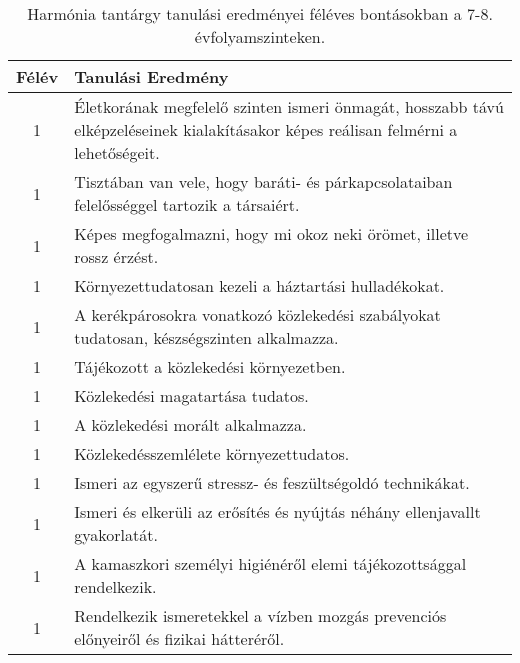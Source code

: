        
           \begin{longtable}{c | p{12cm} }
            \caption[Harmónia 7-8.]{Harmónia tantárgy tanulási eredményei féléves bontásokban a 7-8. évfolyamszinteken. }  \\

            \textbf{Félév} & \textbf{Tanulási Eredmény} \\
            \hline
            \endhead
                                
                                      
                                
                                          1 &  Életkorának megfelelő szinten ismeri önmagát, hosszabb távú elképzeléseinek kialakításakor képes reálisan felmérni a lehetőségeit. \\ \hline
                                          1 &  Tisztában van vele, hogy baráti- és párkapcsolataiban felelősséggel tartozik a társaiért. \\ \hline
                                          1 &  Képes megfogalmazni, hogy mi okoz neki örömet, illetve rossz érzést. \\ \hline
                                          1 &  Környezettudatosan kezeli a háztartási hulladékokat. \\ \hline
                                          1 &  A kerékpárosokra vonatkozó közlekedési szabályokat tudatosan, készségszinten alkalmazza. \\ \hline
                                          1 &  Tájékozott a közlekedési környezetben. \\ \hline
                                          1 &  Közlekedési magatartása tudatos. \\ \hline
                                          1 &  A közlekedési morált alkalmazza. \\ \hline
                                          1 &  Közlekedésszemlélete környezettudatos. \\ \hline
                                          1 &  Ismeri az egyszerű stressz- és feszültségoldó technikákat. \\ \hline
                                          1 &  Ismeri és elkerüli az erősítés és nyújtás néhány ellenjavallt gyakorlatát. \\ \hline
                                          1 &  A kamaszkori személyi higiénéről elemi tájékozottsággal rendelkezik. \\ \hline
                                          1 &  Rendelkezik ismeretekkel a vízben mozgás prevenciós előnyeiről és fizikai hátteréről. \\ \hline

\end{longtable}
